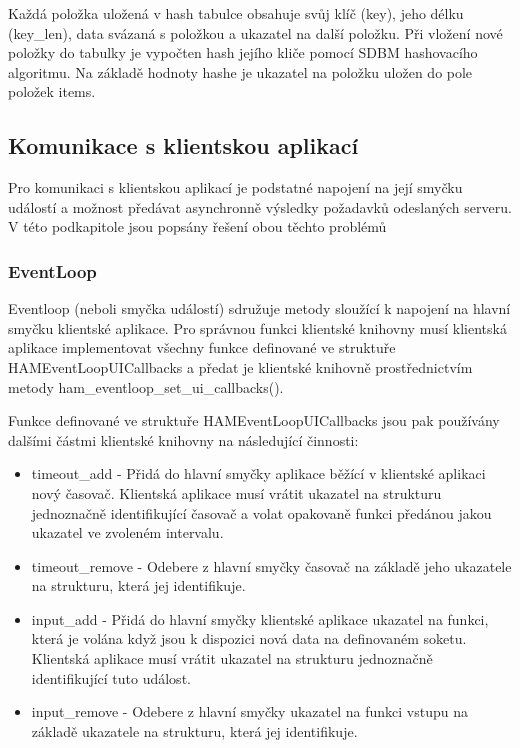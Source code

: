 Každá položka uložená v hash tabulce obsahuje svůj klíč (key), jeho délku (key\_len), data svázaná s položkou a ukazatel
na další položku. Při vložení nové položky do tabulky je vypočten hash jejího kliče pomocí SDBM
hashovacího algoritmu. %
Na základě hodnoty hashe je ukazatel na položku uložen do pole položek items.

\subsection{Komunikace s klientskou aplikací}
\label{implementace_knihovna_komunikace}

Pro komunikaci s klientskou aplikací je podstatné napojení na její smyčku událostí a možnost předávat asynchronně
výsledky požadavků odeslaných serveru. V této podkapitole jsou popsány řešení obou těchto problémů

\subsubsection{EventLoop}

Eventloop (neboli smyčka událostí) sdružuje metody sloužící k napojení na hlavní smyčku
klientské aplikace. Pro správnou funkci klientské
knihovny musí klientská aplikace implementovat všechny funkce definované ve struktuře HAMEventLoopUICallbacks a
předat je klientské knihovně prostřednictvím metody ham\_eventloop\_set\_ui\_callbacks().

Funkce definované ve struktuře HAMEventLoopUICallbacks jsou pak používány dalšími částmi klientské knihovny na
následující činnosti:

\begin{itemize}
\item timeout\_add - Přidá do hlavní smyčky aplikace běžící v klientské aplikaci
nový časovač. Klientská aplikace
musí vrátit ukazatel na strukturu jednoznačně identifikující časovač a
volat opakovaně funkci předánou jakou ukazatel ve zvoleném intervalu.
\item timeout\_remove - Odebere z hlavní smyčky časovač na základě jeho ukazatele na strukturu, která jej identifikuje.
\item input\_add - Přidá do hlavní smyčky klientské aplikace ukazatel na funkci, která je volána když jsou k dispozici
nová data na definovaném soketu. Klientská aplikace
musí vrátit ukazatel na strukturu jednoznačně identifikující tuto událost.
\item input\_remove - Odebere z hlavní smyčky ukazatel na funkci vstupu na
základě ukazatele na strukturu, která jej identifikuje.
\end{itemize}


